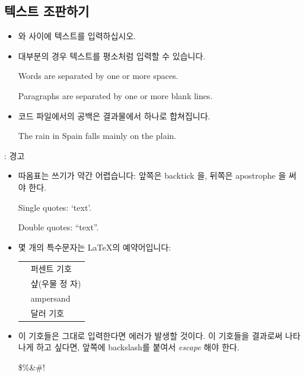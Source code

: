 \documentclass{beamer}
\begin{document}
\subsection{텍스트 조판하기}
\begin{frame}[fragile]{\insertsubsection{}}
\small
\begin{itemize}
\item {} 와  사이에 텍스트를 입력하십시오.
\item 대부분의 경우 텍스트를 평소처럼 입력할 수 있습니다.
\begin{exampletwouptiny}
	Words are separated by one or more
	spaces.
	
	Paragraphs are separated by one
	or more blank lines.
\end{exampletwouptiny}
\item 코드 파일에서의 공백은 결과물에서 하나로 합쳐집니다.
\begin{exampletwouptiny}
	The   rain       in Spain
	falls mainly on the plain.
\end{exampletwouptiny}
\end{itemize}
\end{frame}

\begin{frame}[fragile]{\insertsubsection{}: 경고}
\small
\begin{itemize}
\item 따옴표는 쓰기가 약간 어렵습니다: 앞쪽은 backtick \keystroke{\`{}}을, 뒤쪽은 apostrophe \keystroke{\'{}} 을 써야 한다.
\begin{exampletwouptiny}
	Single quotes: `text'.
	
	Double quotes: ``text''.
\end{exampletwouptiny}

\item 몇 개의 특수문자는 \LaTeX 의 예약어입니다:\\[1ex]
\begin{tabular}{cl}
\keystrokebftt{\%} & 퍼센트 기호               \\
\keystrokebftt{\#} & 샾(우물 정 자)            \\
\keystrokebftt{\&} & ampersand                 \\
\keystrokebftt{\$} & 달러 기호                 \\
\end{tabular}
\item 이 기호들은 그대로 입력한다면 에러가 발생할 것이다. 이 기호들을 결과로써
나타나게 하고 싶다면, 앞쪽에 backslash를 붙여서 \emph{escape} 해야 한다.
\begin{exampletwoup}
\$\%\&\#!
\end{exampletwoup}
\end{itemize}
\end{frame}
\end{document}
